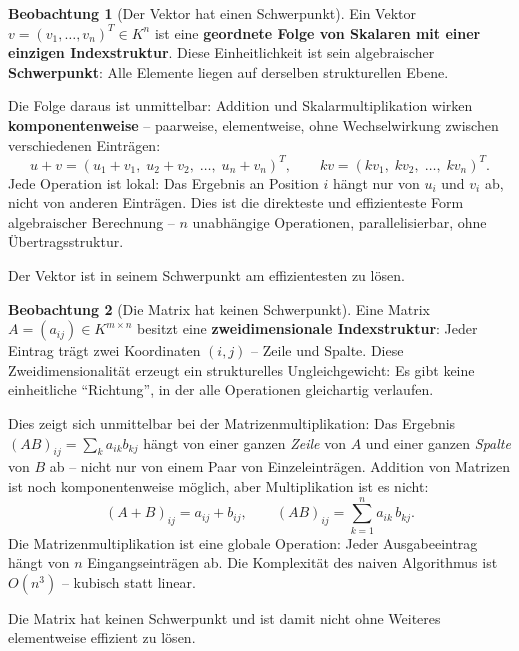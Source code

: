 ﻿\documentclass[a4paper,12pt]{report}
\theoremstyle{definition}
\newtheorem{beobachtung}{Beobachtung}
\begin{document}
\begin{beobachtung}[Der Vektor hat einen Schwerpunkt]
    Ein Vektor $v = (v_1, \dots, v_n)^T \in K^n$ ist eine \textbf{geordnete
    Folge von Skalaren mit einer einzigen Indexstruktur}. Diese Einheitlichkeit
    ist sein algebraischer \textbf{Schwerpunkt}: Alle Elemente liegen auf
    derselben strukturellen Ebene.

    Die Folge daraus ist unmittelbar: Addition und Skalarmultiplikation
    wirken \textbf{komponentenweise} -- paarweise, elementweise, ohne
    Wechselwirkung zwischen verschiedenen Einträgen:
    \[
        u + v = (u_1 + v_1,\; u_2 + v_2,\; \dots,\; u_n + v_n)^T, \qquad
        kv = (kv_1,\; kv_2,\; \dots,\; kv_n)^T.
    \]
    Jede Operation ist lokal: Das Ergebnis an Position $i$ hängt nur von
    $u_i$ und $v_i$ ab, nicht von anderen Einträgen. Dies ist die
    direkteste und effizienteste Form algebraischer Berechnung --
    $n$ unabhängige Operationen, parallelisierbar, ohne Übertragsstruktur.

    Der Vektor ist in seinem Schwerpunkt am effizientesten zu lösen.
\end{beobachtung}

\begin{beobachtung}[Die Matrix hat keinen Schwerpunkt]
    Eine Matrix $A = (a_{ij}) \in K^{m \times n}$ besitzt eine
    \textbf{zweidimensionale Indexstruktur}: Jeder Eintrag trägt zwei
    Koordinaten $(i, j)$ -- Zeile und Spalte. Diese Zweidimensionalität
    erzeugt ein strukturelles Ungleichgewicht: Es gibt keine einheitliche
    ``Richtung'', in der alle Operationen gleichartig verlaufen.

    Dies zeigt sich unmittelbar bei der Matrizenmultiplikation: Das
    Ergebnis $(AB)_{ij} = \sum_k a_{ik} b_{kj}$ hängt von einer ganzen
    \emph{Zeile} von $A$ und einer ganzen \emph{Spalte} von $B$ ab --
    nicht nur von einem Paar von Einzeleinträgen. Addition von Matrizen
    ist noch komponentenweise möglich, aber Multiplikation ist es nicht:
    \[
        (A + B)_{ij} = a_{ij} + b_{ij}, \qquad
        (AB)_{ij} = \sum_{k=1}^{n} a_{ik}\, b_{kj}.
    \]
    Die Matrizenmultiplikation ist eine globale Operation: Jeder
    Ausgabeeintrag hängt von $n$ Eingangseinträgen ab. Die Komplexität
    des naiven Algorithmus ist $O(n^3)$ -- kubisch statt linear.

    Die Matrix hat keinen Schwerpunkt und ist damit nicht ohne Weiteres
    elementweise effizient zu lösen.
\end{beobachtung}
\end{document}
